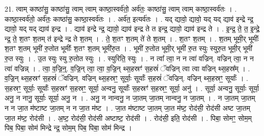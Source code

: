 \documentclass[17pt]{extarticle}
\begin{document}
21. त्वाम् काष्ठा॑सु॒ काष्ठा॑सु॒ त्वाम् त्वाम् काष्ठा॒स्वर्व॑तो॒ अर्व॑तः॒ काष्ठा॑सु॒ त्वाम् त्वाम् काष्ठा॒स्वर्व॑तः । . काष्ठा॒स्वर्व॑तो॒ अर्व॑तः॒ काष्ठा॑सु॒ काष्ठा॒स्वर्व॑तः । . अर्व॑त॒ इत्यर्व॑तः । . यद् द्यावो॒ द्यावो॒ यद् यद् द्याव॑ इन्द्रे न्द्र॒ द्यावो॒ यद् यद् द्याव॑ इन्द्र । . द्याव॑ इन्द्रे न्द्र॒ द्यावो॒ द्याव॑ इन्द्र ते त इन्द्र॒ द्यावो॒ द्याव॑ इन्द्र ते । . इ॒न्द्र॒ ते॒ त॒ इ॒न्द्रे॒ न्द्र॒ ते॒ श॒तꣳ श॒तम् त॑ इन्द्रे न्द्र ते श॒तम् । . ते॒ श॒तꣳ श॒तम् ते॑ ते श॒तम् । . श॒तꣳ श॒तम् । . श॒तम् भूमी॒र् भूमीः᳚ श॒तꣳ श॒तम् भूमी॑ रु॒तोत भूमीः᳚ श॒तꣳ श॒तम् भूमी॑रु॒त । . भूमी॑ रु॒तोत भूमी॒र् भूमी॑ रु॒त स्युः स्युरु॒त भूमी॒र् भूमी॑ रु॒त स्युः । . उ॒त स्युः स्यु रु॒तोत स्युः । . स्युरिति॒ स्युः । . न त्वा᳚ त्वा॒ न न त्वा॑ वज्रिन्. वज्रिन् त्वा॒ न न त्वा॑ वज्रिन्न् । . त्वा॒ व॒ज्रि॒न्॒. व॒ज्रि॒न् त्वा॒ त्वा॒ व॒ज्रि॒न् थ्स॒हस्रꣳ॑ स॒हस्रं॑ ॅवज्रिन् त्वा त्वा वज्रिन् थ्स॒हस्र᳚म् । . व॒ज्रि॒न् थ्स॒हस्रꣳ॑ स॒हस्रं॑ ॅवज्रिन्. वज्रिन् थ्स॒हस्रꣳ॒॒ सूर्याः॒ सूर्याः᳚ स॒हस्रं॑ ॅवज्रिन्. वज्रिन् थ्स॒हस्रꣳ॒॒ सूर्याः᳚ । . स॒हस्रꣳ॒॒ सूर्याः॒ सूर्याः᳚ स॒हस्रꣳ॑ स॒हस्रꣳ॒॒ सूर्या॒ अन्वनु॒ सूर्याः᳚ स॒हस्रꣳ॑ स॒हस्रꣳ॒॒ सूर्या॒ अनु॑ । . सूर्या॒ अन्वनु॒ सूर्याः॒ सूर्या॒ अनु॒ न नानु॒ सूर्याः॒ सूर्या॒ अनु॒ न । . अनु॒ न नान्वनु॒ न जा॒तम् जा॒तम् नान्वनु॒ न जा॒तम् । . न जा॒तम् जा॒तम् न न जा॒त म॑ष्टाष्ट जा॒तम् न न जा॒त म॑ष्ट । . जा॒त म॑ष्टाष्ट जा॒तम् जा॒त म॑ष्ट॒ रोद॑सी॒ रोद॑सी अष्ट जा॒तम् जा॒त म॑ष्ट॒ रोद॑सी । . अ॒ष्ट॒ रोद॑सी॒ रोद॑सी अष्टाष्ट॒ रोद॑सी । . रोद॑सी॒ इति॒ रोद॑सी । . पिबा॒ सोमꣳ॒॒ सोम॒म् पिब॒ पिबा॒ सोम॑ मिन्द्रे न्द्र॒ सोम॒म् पिब॒ पिबा॒ सोम॑ मिन्द्र । \newline
\end{document}
